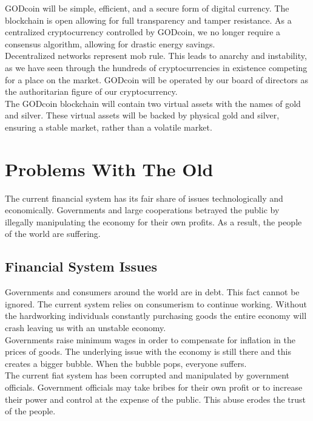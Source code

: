 \documentclass[12pt,a4paper]{article}
\begin{document}
  GODcoin will be simple, efficient, and a secure form of digital currency. The
  blockchain is open allowing for full transparency and tamper resistance. As a
  centralized cryptocurrency controlled by GODcoin, we no longer require a
  consensus algorithm, allowing for drastic energy savings.\\

  Decentralized networks represent mob rule. This leads to anarchy and
  instability, as we have seen through the hundreds of cryptocurrencies in
  existence competing for a place on the market. GODcoin will be operated by our
  board of directors as the authoritarian figure of our cryptocurrency.\\

  The GODcoin blockchain will contain two virtual assets with the names of gold
  and silver. These virtual assets will be backed by physical gold and silver,
  ensuring a stable market, rather than a volatile market.

  \section{Problems With The Old}
  The current financial system has its fair share of issues technologically and
  economically. Governments and large cooperations betrayed the public by
  illegally manipulating the economy for their own profits. As a result, the
  people of the world are suffering.

  \subsection{Financial System Issues}
  Governments and consumers around the world are in debt. This fact cannot be
  ignored. The current system relies on consumerism to continue working. Without
  the hardworking individuals constantly purchasing goods the entire economy
  will crash leaving us with an unstable economy.\\

  Governments raise minimum wages in order to compensate for inflation in the
  prices of goods. The underlying issue with the economy is still there and this
  creates a bigger bubble. When the bubble pops, everyone suffers.\\

  The current fiat system has been corrupted and manipulated by government
  officials. Government officials may take bribes for their own profit or to
  increase their power and control at the expense of the public. This abuse
  erodes the trust of the people.\\
\end{document}
